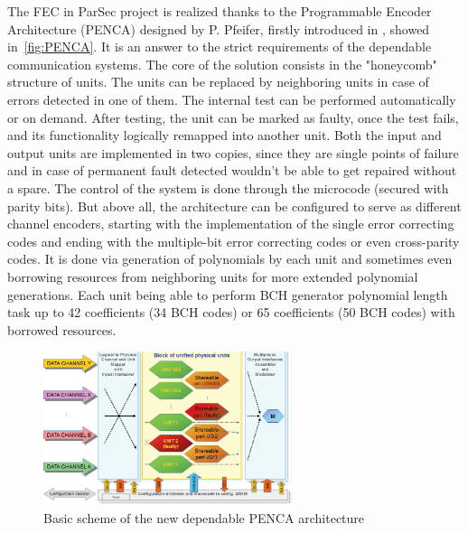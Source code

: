 The FEC in ParSec project is realized thanks to the Programmable Encoder Architecture (PENCA) designed by P. Pfeifer, firstly introduced in \cite{art:Pfeifer}, showed in~\autoref{fig:PENCA}. It is an answer to the strict requirements of the dependable communication systems. The core of the solution consists in the "honeycomb" structure of units. The units can be replaced by neighboring units in case of errors detected in one of them. The internal test can be performed automatically or on demand. After testing, the unit can be marked as faulty, once the test fails, and its functionality logically remapped into another unit. Both the input and output units are implemented in two copies, since they are single points of failure and in case of permanent fault detected wouldn't be able to get repaired without a spare. The control of the system is done through the microcode (secured with parity bits). But above all, the architecture can be configured to serve as different channel encoders, starting with the implementation of the single error correcting codes and ending with the multiple-bit error correcting codes or even cross-parity codes. It is done via generation of polynomials by each unit and sometimes even borrowing resources from neighboring units for more extended polynomial generations. Each unit being able to perform BCH generator polynomial length task up to 42 coefficients (34 BCH codes) or 65 coefficients (50 BCH codes) with borrowed resources.

 \begin{figure}[h]
 \centering
\includegraphics[width=0.65\textwidth]{figures/PENCA.png}
\caption{Basic scheme of the new dependable PENCA architecture~\cite{art:Pfeifer}}
\label{fig:PENCA}
\end{figure}


